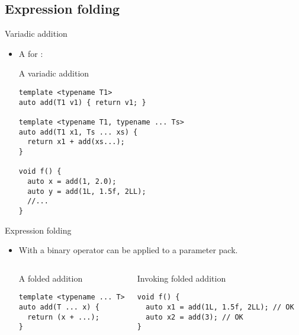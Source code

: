 \subsection{Expression folding}

\begin{frame}[t,fragile]{Variadic addition}
\begin{itemize}
  \item A  for :

\begin{block}{A variadic addition}
\begin{lstlisting}
template <typename T1>
auto add(T1 v1) { return v1; }

template <typename T1, typename ... Ts>
auto add(T1 x1, Ts ... xs) {
  return x1 + add(xs...);
}

void f() {
  auto x = add(1, 2.0);
  auto y = add(1L, 1.5f, 2LL);
  //...
}
\end{lstlisting}
\end{block}
\end{itemize}
\end{frame}

\begin{frame}[t,fragile]{Expression folding}
\begin{itemize}
  \item With  a binary operator
        can be applied to a parameter pack.

\begin{columns}[T]

\begin{block}{A folded addition}
\begin{lstlisting}
template <typename ... T>
auto add(T ... x) {
  return (x + ...);
}
\end{lstlisting}
\end{block}

\begin{block}{Invoking folded addition}
\begin{lstlisting}
void f() {
  auto x1 = add(1L, 1.5f, 2LL); // OK
  auto x2 = add(3); // OK
}
\end{lstlisting}
\end{block}

\end{columns}
\end{itemize}
\end{frame}

